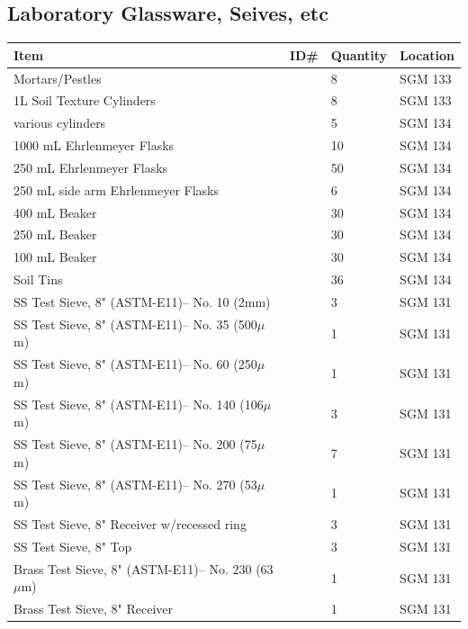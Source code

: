 \documentclass[12pt]{../SOP4_alpha}\usepackage[]{graphicx}\usepackage[]{xcolor}
\begin{document}
\subsection{Laboratory Glassware, Seives, etc}

\begin{tabular}{|l|l|l|l|}
\hline
Item      & ID\#  & Quantity & Location \\ \hline
Mortars/Pestles             && 8 & SGM 133\\
1L Soil Texture Cylinders   && 8 & SGM 133 \\
various cylinders           && 5 & SGM 134\\
1000 mL Ehrlenmeyer Flasks && 10 & SGM 134 \\
250 mL Ehrlenmeyer Flasks && 50 & SGM 134 \\
250 mL side arm  Ehrlenmeyer Flasks && 6 & SGM 134 \\
400 mL Beaker          &&  30  & SGM 134 \\
250 mL Beaker          &&  30  & SGM 134 \\
100 mL Beaker          &&  30  & SGM 134 \\
Soil Tins                   && 36 & SGM 134\\
SS Test Sieve, 8" (ASTM-E11)-- No. 10 (2mm) && 3  & SGM 131 \\
SS Test Sieve, 8" (ASTM-E11)-- No. 35 (500$\mu$m) && 1  & SGM 131 \\
SS Test Sieve, 8" (ASTM-E11)-- No. 60 (250$\mu$m) && 1  & SGM 131 \\
SS Test Sieve, 8" (ASTM-E11)-- No. 140 (106$\mu$m) && 3  & SGM 131 \\
SS Test Sieve, 8" (ASTM-E11)-- No. 200 (75$\mu$m) && 7  & SGM 131 \\
SS Test Sieve, 8" (ASTM-E11)-- No. 270 (53$\mu$m) && 1  & SGM 131 \\
SS Test Sieve, 8" Receiver w/recessed ring && 3  & SGM 131 \\
SS Test Sieve, 8" Top                  && 3  & SGM 131 \\

Brass Test Sieve, 8" (ASTM-E11)-- No. 230 (63$\mu$m) && 1  & SGM 131 \\
Brass Test Sieve, 8" Receiver && 1  & SGM 131 \\


\end{tabular}
\end{document}
